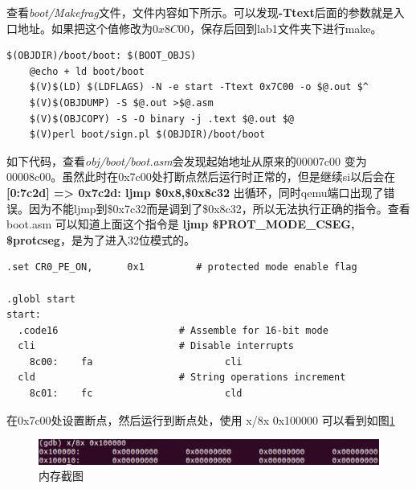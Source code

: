 \begin{ExerciseList}

查看\emph{boot/Makefrag}文件，文件内容如下所示。可以发现\textbf{-Ttext}后面的参数就是入口地址。如果把这个值修改为$0x8C00$，保存后回到lab1文件夹下进行make。

\begin{verbatim}
$(OBJDIR)/boot/boot: $(BOOT_OBJS)
    @echo + ld boot/boot
    $(V)$(LD) $(LDFLAGS) -N -e start -Ttext 0x7C00 -o $@.out $^
    $(V)$(OBJDUMP) -S $@.out >$@.asm
    $(V)$(OBJCOPY) -S -O binary -j .text $@.out $@
    $(V)perl boot/sign.pl $(OBJDIR)/boot/boot

\end{verbatim}

如下代码，查看\emph{obj/boot/boot.asm}会发现起始地址从原来的00007c00 变为 00008c00。虽然此时在0x7c00处打断点然后运行时正常的，但是继续si以后会在 \textbf{[0:7c2d] => 0x7c2d: ljmp \$0x8,\$0x8c32} 出循环，同时qemu端口出现了错误。因为不能ljmp到\$0x7c32而是调到了\$0x8c32，所以无法执行正确的指令。查看 boot.asm 可以知道上面这个指令是 \textbf{ljmp \$PROT\_MODE\_CSEG, \$protcseg}，是为了进入32位模式的。

\begin{verbatim}
.set CR0_PE_ON,      0x1         # protected mode enable flag

.globl start
start:
  .code16                     # Assemble for 16-bit mode
  cli                         # Disable interrupts
    8c00:    fa                       cli
  cld                         # String operations increment
    8c01:    fc                       cld
\end{verbatim}


在0x7c00处设置断点，然后运行到断点处，使用 x/8x 0x100000 可以看到如图\ref{fig:lab1:gdb_x}

\begin{figure}[H]
  \centering
  \includegraphics[width=6in]{figures/lab1/gdb_x.png}
  \caption{内存截图}\label{fig:lab1:gdb_x}
\end{figure}


\end{ExerciseList}
